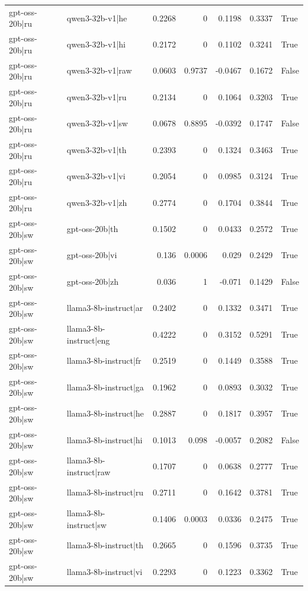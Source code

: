 \begin{table}
\begin{tabular}{l l r r r r l}
gpt-oss-20b|ru & qwen3-32b-v1|he & 0.2268 & 0 & 0.1198 & 0.3337 & True \\
gpt-oss-20b|ru & qwen3-32b-v1|hi & 0.2172 & 0 & 0.1102 & 0.3241 & True \\
gpt-oss-20b|ru & qwen3-32b-v1|raw & 0.0603 & 0.9737 & -0.0467 & 0.1672 & False \\
gpt-oss-20b|ru & qwen3-32b-v1|ru & 0.2134 & 0 & 0.1064 & 0.3203 & True \\
gpt-oss-20b|ru & qwen3-32b-v1|sw & 0.0678 & 0.8895 & -0.0392 & 0.1747 & False \\
gpt-oss-20b|ru & qwen3-32b-v1|th & 0.2393 & 0 & 0.1324 & 0.3463 & True \\
gpt-oss-20b|ru & qwen3-32b-v1|vi & 0.2054 & 0 & 0.0985 & 0.3124 & True \\
gpt-oss-20b|ru & qwen3-32b-v1|zh & 0.2774 & 0 & 0.1704 & 0.3844 & True \\
gpt-oss-20b|sw & gpt-oss-20b|th & 0.1502 & 0 & 0.0433 & 0.2572 & True \\
gpt-oss-20b|sw & gpt-oss-20b|vi & 0.136 & 0.0006 & 0.029 & 0.2429 & True \\
gpt-oss-20b|sw & gpt-oss-20b|zh & 0.036 & 1 & -0.071 & 0.1429 & False \\
gpt-oss-20b|sw & llama3-8b-instruct|ar & 0.2402 & 0 & 0.1332 & 0.3471 & True \\
gpt-oss-20b|sw & llama3-8b-instruct|eng & 0.4222 & 0 & 0.3152 & 0.5291 & True \\
gpt-oss-20b|sw & llama3-8b-instruct|fr & 0.2519 & 0 & 0.1449 & 0.3588 & True \\
gpt-oss-20b|sw & llama3-8b-instruct|ga & 0.1962 & 0 & 0.0893 & 0.3032 & True \\
gpt-oss-20b|sw & llama3-8b-instruct|he & 0.2887 & 0 & 0.1817 & 0.3957 & True \\
gpt-oss-20b|sw & llama3-8b-instruct|hi & 0.1013 & 0.098 & -0.0057 & 0.2082 & False \\
gpt-oss-20b|sw & llama3-8b-instruct|raw & 0.1707 & 0 & 0.0638 & 0.2777 & True \\
gpt-oss-20b|sw & llama3-8b-instruct|ru & 0.2711 & 0 & 0.1642 & 0.3781 & True \\
gpt-oss-20b|sw & llama3-8b-instruct|sw & 0.1406 & 0.0003 & 0.0336 & 0.2475 & True \\
gpt-oss-20b|sw & llama3-8b-instruct|th & 0.2665 & 0 & 0.1596 & 0.3735 & True \\
gpt-oss-20b|sw & llama3-8b-instruct|vi & 0.2293 & 0 & 0.1223 & 0.3362 & True \\

\end{tabular}
\end{table}
